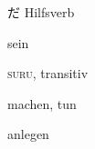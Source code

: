 \vocab
  {だ  }
  {Hilfsverb}
  {\item sein}

  {\textsc{suru}, transitiv}
  {\item machen, tun
   \item anlegen 
   }













